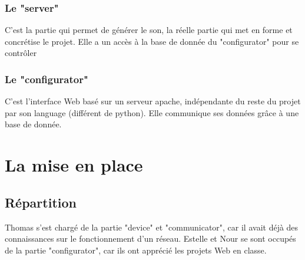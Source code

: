 \documentclass[12pt]{article}
\begin{document}
	\subsubsection{Le "server"}
	C'est la partie qui permet de générer le son, la réelle partie qui met en forme et concrétise le projet. Elle a un accès à la base de donnée du "configurator" pour se contrôler
	\subsubsection{Le "configurator"}
	C'est l'interface Web basé sur un serveur apache, indépendante du reste du projet par son language (différent de python). Elle communique ses données grâce à une base de donnée. 
	\section{La mise en place}
	\subsection{Répartition}
	Thomas s'est chargé de la partie "device" et "communicator", car il avait déjà des connaissances sur le fonctionnement d'un réseau. Estelle et Nour se sont occupés de la partie "configurator", car ils ont apprécié les projets Web en classe.
\end{document}
